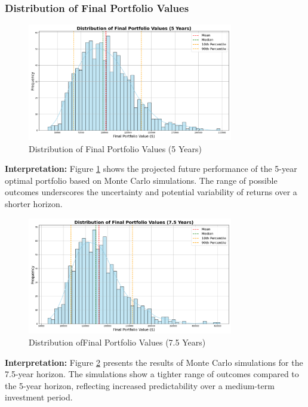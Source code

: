 \subsubsection{Distribution of Final Portfolio Values}
\begin{figure}[!htbp]
    \centering
    \includegraphics[width=0.8\textwidth]{../Figures/final_portfolio_values_distribution_5_years.png}
    \caption{Distribution of Final Portfolio Values (5 Years)}
    \label{fig:final_portfolio_values_5y}
\end{figure}

\textbf{Interpretation:} Figure \ref{fig:final_portfolio_values_5y} shows the projected future performance of the 5-year optimal portfolio based on Monte Carlo simulations. The range of possible outcomes underscores the uncertainty and potential variability of returns over a shorter horizon.

\begin{figure}[!htbp]
    \centering
    \includegraphics[width=0.8\textwidth]{../Figures/final_portfolio_values_distribution_7_5_years.png}
    \caption{Distribution ofFinal Portfolio Values (7.5 Years)}
    \label{fig:final_portfolio_values_7_5y}
\end{figure}

\textbf{Interpretation:} Figure \ref{fig:final_portfolio_values_7_5y} presents the results of Monte Carlo simulations for the 7.5-year horizon. The simulations show a tighter range of outcomes compared to the 5-year horizon, reflecting increased predictability over a medium-term investment period.

